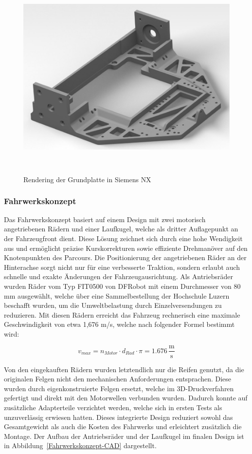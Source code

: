 \documentclass[main.tex]{subfiles} %
\begin{document}
\begin{figure}[H]
    \centering
    \includegraphics[width = 0.7\linewidth]{./fig_Mechanik/Rendering_Grundplatte.pdf}
    \caption{Rendering der Grundplatte in Siemens NX}~\label{Chassis-Grundplatte}
\end{figure}


\subsubsection*{Fahrwerkskonzept}

Das Fahrwerkskonzept basiert auf einem Design mit zwei motorisch angetriebenen Rädern 
und einer Laufkugel, welche als dritter Auflagepunkt an der Fahrzeugfront dient. 
Diese Lösung zeichnet sich durch eine hohe Wendigkeit aus und ermöglicht präzise 
Kurskorrekturen sowie effiziente Drehmanöver auf den Knotenpunkten des Parcours. 
Die Positionierung der angetriebenen Räder an der Hinterachse sorgt nicht nur für eine 
verbesserte Traktion, sondern erlaubt auch schnelle und exakte Änderungen der 
Fahrzeugausrichtung. Als Antriebsräder wurden Räder vom Typ FIT0500 von DFRobot mit 
einem Durchmesser von 80 mm ausgewählt, welche über eine Sammelbestellung der Hochschule 
Luzern beschafft wurden, um die Umweltbelastung durch Einzelversendungen zu reduzieren. 
Mit diesen Rädern erreicht das Fahrzeug rechnerisch eine maximale Geschwindigkeit von 
etwa 1,676 m/s, welche nach folgender Formel bestimmt wird:

\[ v_{max} = n_{Motor} \cdot d_{Rad} \cdot \pi = 1.676 \, \frac{\text{m}}{\text{s}} \]

Von den eingekauften Rädern wurden letztendlich nur die Reifen genutzt, da die 
originalen Felgen nicht den mechanischen Anforderungen entsprachen. Diese wurden durch 
eigenkonstruierte Felgen ersetzt, welche im 3D-Druckverfahren gefertigt und direkt mit 
den Motorwellen verbunden wurden. Dadurch konnte auf zusätzliche Adapterteile verzichtet 
werden, welche sich in ersten Tests als unzuverlässig erwiesen hatten. Dieses integrierte 
Design reduziert sowohl das Gesamtgewicht als auch die Kosten des Fahrwerks und 
erleichtert zusätzlich die Montage. Der Aufbau der Antriebsräder und der Laufkugel im 
finalen Design ist in Abbildung~\ref{Fahrwerkskonzept-CAD} dargestellt.
\end{document}
